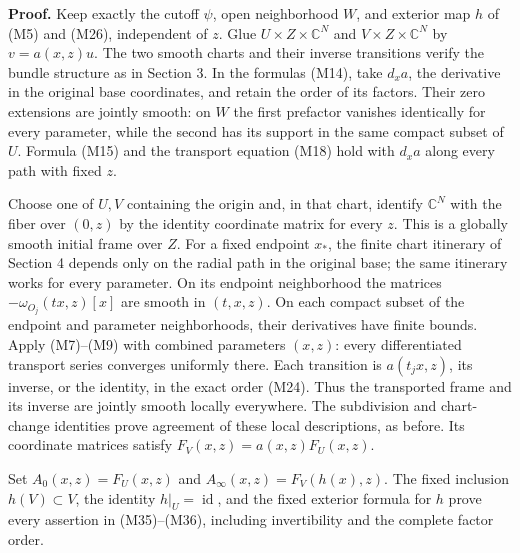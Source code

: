 \documentclass[
  11pt,
]{article}
\begin{document}
\textbf{Proof.} Keep exactly the cutoff \(\psi\), open neighborhood
\(W\), and exterior map \(h\) of (M5) and (M26), independent of \(z\).
Glue \(U\times Z\times\mathbb C^N\) and \(V\times Z\times\mathbb C^N\)
by \(v=a(x,z)u\). The two smooth charts and their inverse transitions
verify the bundle structure as in Section 3. In the formulas (M14), take
\(d_xa\), the derivative in the original base coordinates, and retain
the order of its factors. Their zero extensions are jointly smooth: on
\(W\) the first prefactor vanishes identically for every parameter,
while the second has its support in the same compact subset of \(U\).
Formula (M15) and the transport equation (M18) hold with \(d_xa\) along
every path with fixed \(z\).

Choose one of \(U,V\) containing the origin and, in that chart, identify
\(\mathbb C^N\) with the fiber over \((0,z)\) by the identity coordinate
matrix for every \(z\). This is a globally smooth initial frame over
\(Z\). For a fixed endpoint \(x_*\), the finite chart itinerary of
Section 4 depends only on the radial path in the original base; the same
itinerary works for every parameter. On its endpoint neighborhood the
matrices \(-\omega_{O_j}(tx,z)[x]\) are smooth in \((t,x,z)\). On each
compact subset of the endpoint and parameter neighborhoods, their
derivatives have finite bounds. Apply (M7)--(M9) with combined
parameters \((x,z)\): every differentiated transport series converges
uniformly there. Each transition is \(a(t_jx,z)\), its inverse, or the
identity, in the exact order (M24). Thus the transported frame and its
inverse are jointly smooth locally everywhere. The subdivision and
chart-change identities prove agreement of these local descriptions, as
before. Its coordinate matrices satisfy \(F_V(x,z)=a(x,z)F_U(x,z)\).

Set \(A_0(x,z)=F_U(x,z)\) and \(A_\infty(x,z)=F_V(h(x),z)\). The fixed
inclusion \(h(V)\subset V\), the identity \(h|_U=\operatorname{id}\),
and the fixed exterior formula for \(h\) prove every assertion in
(M35)--(M36), including invertibility and the complete factor order.
\end{document}
